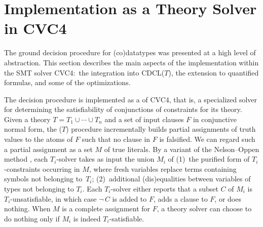 \section{Implementation as a Theory Solver in CVC4}
\label{sec:implementation-as-a-theory-solver-in-cvc4}

The ground decision procedure for (co)datatypes
was presented at a high level of abstraction. This section describes
the main aspects of the implementation within the SMT solver CVC4:\ the
integration into CDCL($T$), the extension to quantified formulas, and
some of the optimizations.


The decision procedure is implemented as a  of CVC4, that is, a
specialized solver for determining the satisfiability of conjunctions of
constraints for its theory.
Given a theory $T = T_1 \mathrel\cup \cdots \mathrel\cup T_n$ and a set of
input clauses $F$ in conjunctive normal form, the \XXXL($T$) procedure
incrementally builds partial assignments of
truth values to the atoms of $F$ such that no clause in $F$ is falsified. We can regard such a
partial assignment as a set $M$ of true literals.
By a variant of the Nelson--Oppen method \cite{jovanovic2011sharing,nelson-oppen-1979},
each $T_i$-solver %
takes as input the union $M_i$
of (1)~the purified form of $T_i$-constraints occurring in $M$, where fresh
variables replace terms containing symbols not belonging to~$T_i$;
(2)~additional (dis)equalities between variables of types not belonging to
$T_i$. Each $T_i$-solver
either reports that a subset $C$ of $M_i$ is $T_i$-unsatisfiable, in which case
$\neg\, C$ is added to $F\!$, adds a clause to $F\!$, or does nothing.
When $M$ is a complete assignment for $F\!$, a theory solver can choose to do
nothing only if $M_i$ is indeed $T_i$-satisfiable.

